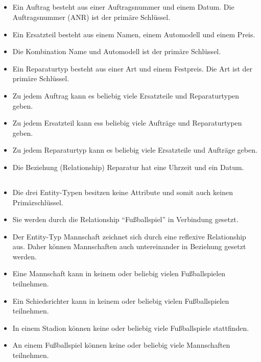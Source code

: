 \documentclass[ngerman]{gdb-aufgabenblatt}
\begin{document}
	\subsection{} %
		\begin{itemize}
			\item	Ein Auftrag besteht aus einer Auftragsnummer und einem Datum. Die Auftragsnummer (ANR) ist der primäre Schlüssel.
			\item	Ein Ersatzteil besteht aus einem Namen, einem Automodell und einem Preis.
			\item	Die Kombination Name und Automodell ist der primäre Schlüssel.
			\item	Ein Reparaturtyp besteht aus einer Art und einem Festpreis. Die Art ist der primäre Schlüssel.
			\item	Zu jedem Auftrag kann es beliebig viele Ersatzteile und Reparaturtypen geben.
			\item	Zu jedem Ersatzteil kann ess beliebig viele Aufträge und Reparaturtypen geben.
			\item	Zu jedem Reparaturtyp kann es beliebig viele Ersatzteile und Aufträge geben.
			\item	Die Beziehung (Relationship) Reparatur hat eine Uhrzeit und ein Datum.
		\end{itemize}
	\subsection{} %
		\begin{itemize}
			\item	Die drei Entity-Typen besitzen keine Attribute und somit auch keinen Primärschlüssel.
			\item	Sie werden durch die Relationship "`Fußballspiel"' in Verbindung gesetzt.
			\item	Der Entity-Typ Mannschaft zeichnet sich durch eine reflexive Relationship aus. Daher können Mannschaften auch untereinander in Beziehung gesetzt werden.
			\item	Eine Mannschaft kann in keinem oder beliebig vielen Fußballspielen teilnehmen.
			\item	Ein Schiedsrichter kann in keinem oder beliebig vielen Fußballspielen teilnehmen.
			\item	In einem Stadion können keine oder beliebig viele Fußballspiele stattfinden.
			\item	An einem Fußballspiel können keine oder beliebig viele Mannschaften teilnehmen.
		\end{itemize}
\end{document}
